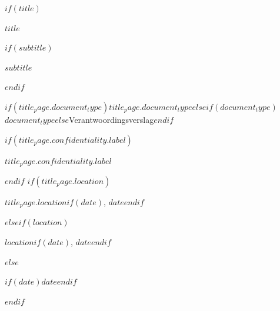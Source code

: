\documentclass[
  $if(fontsize)$$fontsize$,$endif$
  $if(papersize)$$papersize$paper,$endif$
  oneside,
  openany
]{$if(documentclass)$$documentclass$$else$report$endif$}
\newcommand{\DocumentTypeName}{$if(title_page.document_type)$$title_page.document_type$$elseif(document_type)$$document_type$$else$Verantwoordingsverslag$endif$}
\begin{document}
$if(title)$
\begin{titlepage}
  \thispagestyle{empty}
  \begingroup
  \setlength{\parskip}{0pt}
  \vspace*{0.45cm}
  \colorbox{CoverPanel!96}{
    \parbox{\dimexpr\textwidth-2\fboxsep\relax}{
      \vspace*{0.3cm}
      {\sffamily\bfseries\fontsize{25}{30}\selectfont\color{DocumentInk} $title$\par}
      $if(subtitle)$
      \vspace{0.22cm}
      {\sffamily\Large\color{DocumentInk} $subtitle$\par}
      $endif$
      \vspace{0.34cm}
      {\sffamily\Large\color{AccentColor} \DocumentTypeName\par}
      \vspace{0.16cm}
      $if(title_page.confidentiality.label)$
      {\normalsize\color{AccentColor} $title_page.confidentiality.label$\par}
      \vspace{0.14cm}
      $endif$
      $if(title_page.location)$
      {\normalsize\color{DocumentInk} $title_page.location$$if(date)$, $date$$endif$\par}
      $elseif(location)$
      {\normalsize\color{DocumentInk} $location$$if(date)$, $date$$endif$\par}
      $else$
      {\normalsize\color{DocumentInk} $if(date)$$date$$endif$\par}
      $endif$
      \vspace*{0.3cm}
    }
  }


\end{titlepage}
\end{document}

